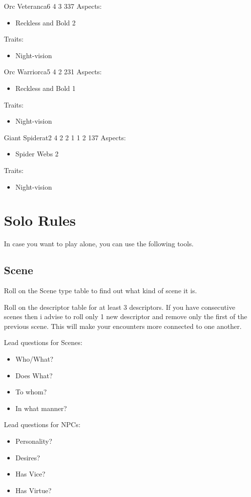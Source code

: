 \documentclass[11pt]{article}
\begin{document}
{\begin{npc}{Orc Veteran}{ca}{6 4 3 3}{37}
Aspects:
\begin{itemize}
\item Reckless and Bold 2
\end{itemize}
Traits:
\begin{itemize}
\item Night-vision
\end{itemize}
\end{npc}

\begin{npc}{Orc Warrior}{ca}{5 4 2 2}{31}
Aspects:
\begin{itemize}
\item Reckless and Bold 1
\end{itemize}
Traits:
\begin{itemize}
\item Night-vision
\end{itemize}
\end{npc}

\begin{npc}{Giant Spider}{at}{2 4 2 2 1 1 2 1}{37}
Aspects:
\begin{itemize}
\item Spider Webs 2
\end{itemize}
Traits:
\begin{itemize}
\item Night-vision
\end{itemize}
\end{npc}


\newpage
\section{Solo Rules}
\label{sec:org540c0f8}
In case you want to play alone, you can use the following tools.
\subsection{Scene}
\label{sec:orgd97f33b}
Roll on the Scene type table to find out what kind of scene it is.

Roll on the descriptor table for at least 3 descriptors. If you have consecutive scenes then i advise to roll only 1 new descriptor and remove only the first of the previous scene. This will make your encounters more connected to one another.

\begin{multicols}{2}
Lead questions for Scenes: 
\begin{itemize}
\item Who/What?
\item Does What?
\item To whom?
\item In what manner?
\end{itemize}
\columnbreak
Lead questions for NPCs:
\begin{itemize}
\item Personality?
\item Desires?
\item Has Vice?
\item Has Virtue?
\end{itemize}
\end{multicols}

}
\end{document}
